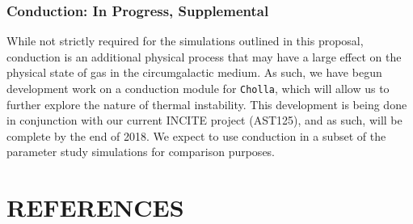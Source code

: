 \documentclass[11pt,letterpaper,english]{article}
\begin{document}
\vspace{-.2in}
\subsubsection{Conduction: In Progress, Supplemental}
\vspace{-.25in}

While not strictly required for the simulations outlined in this proposal, conduction is an additional physical process that may have a large effect on the physical state of gas in the circumgalactic medium. As such, we have begun development work on a conduction module for {\tt Cholla}, which will allow us to further explore the nature of thermal instability. This development is being done in conjunction with our current INCITE project (AST125), and as such, will be complete by the end of 2018. We expect to use conduction in a subset of the parameter study simulations for comparison purposes.

\vspace{-.3in}
\section{REFERENCES}
\vspace{-.3in}

\end{document}
